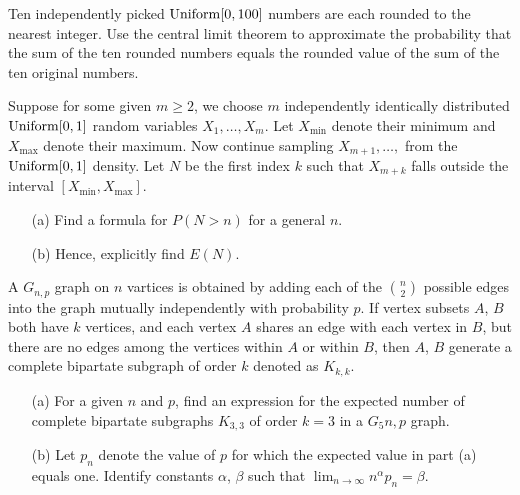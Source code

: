 \begin{problem}
  Ten independently picked \(\operatorname{Uniform}[0,100]\) numbers are each rounded to
  the nearest integer. Use the central limit theorem to approximate the
  probability that the sum of the ten rounded numbers equals the rounded
  value of the sum of the ten original numbers.
\end{problem}
\begin{solution}
\end{solution}

\begin{problem}
  Suppose for some given \(m\geq 2\), we choose \(m\) independently
  identically distributed \(\operatorname{Uniform}[0,1]\) random variables
  \(X_1,\dotsc,X_m\). Let \(X_{\text{min}}\) denote their minimum and
  \(X_{\text{max}}\) denote their maximum. Now continue sampling
  \(X_{m+1},\dotsc,\) from the \(\operatorname{Uniform}[0,1]\) density. Let \(N\) be the
  first index \(k\) such that \(X_{m+k}\) falls outside the interval
  \([X_{\text{min}},X_{\text{max}}]\).
  \begin{itemize}[noitemsep]
  \item[(a)] Find a formula for \(P(N>n)\) for a general \(n\).
  \item[(b)] Hence, explicitly find \(E(N)\).
  \end{itemize}
\end{problem}
\begin{solution}
\end{solution}

\begin{problem}
  A \(G_{n,p}\) graph on \(n\) vartices is obtained by adding each of the
  \(\binom{n}{2}\) possible edges into the graph mutually independently
  with probability \(p\). If vertex subsets \(A\), \(B\) both have \(k\)
  vertices, and each vertex \(A\) shares an edge with each vertex in \(B\),
  but there are no edges among the vertices within \(A\) or within \(B\),
  then \(A\), \(B\) generate a complete bipartate subgraph of order \(k\)
  denoted as \(K_{k,k}\).
  \begin{itemize}[noitemsep]
  \item[(a)] For a given \(n\) and \(p\), find an expression for the
    expected number of complete bipartate subgraphs \(K_{3,3}\) of order
    \(k=3\) in a \(G_5n,p\) graph.
  \item[(b)] Let \(p_n\) denote the value of \(p\) for which the expected
    value in part (a) equals one. Identify constants \(\alpha\), \(\beta\)
    such that \(\lim_{n\to\infty}n^\alpha p_n=\beta\).
  \end{itemize}
\end{problem}
\begin{solution}
\end{solution}

